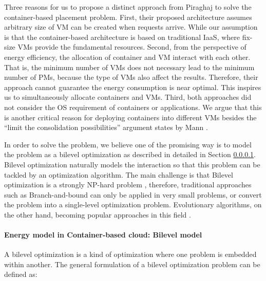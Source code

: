 Three reasons for us to propose a distinct approach from Piraghaj \cite{Piraghaj:2016bw} to solve the container-based placement problem. First, their proposed architecture assumes arbitrary size of VM can be created when requests arrive. While our assumption is that the container-based architecture is based on traditional IaaS, where fix-size VMs provide the fundamental resources. Second, from the perspective of energy efficiency, the allocation of container and VM interact with each other. That is, the minimum number of VMs does not necessary lead to the minimum number of PMs, because the type of VMs also affect the results. Therefore, their approach cannot guarantee the energy consumption is near optimal. This inspires us to simultaneously allocate containers and VMs. Third, both approaches did not consider the OS requirement of containers or applications. We argue that this is another critical reason for deploying containers into different VMs besides the ``limit the consolidation possibilities'' argument states by Mann \cite{Mann:2016hx}.

In order to solve the problem, we believe one of the promising way is to model the problem as a bilevel optimization \cite{Colson:2007bu} as described in detailed in Section \ref{bilevel}. Bilevel optimization naturally models the interaction so that this problem can be tackled by an optimization algorithm. The main challenge is that Bilevel optimization is a strongly NP-hard problem \cite{Sinha:2013tn}, therefore, traditional approaches such as Branch-and-bound \cite{Bard:1982gsa} can only be applied in very small problems, or convert the problem into a single-level optimization problem. Evolutionary algorithms, on the other hand, becoming popular approaches in this field \cite{Wang:2005fa, Sinha:2013tn}. 



\paragraph{Energy model in Container-based cloud: Bilevel model}
\label{bilevel}

A bilevel optimization \cite{Colson:2007bu} is a kind of optimization where one problem is embedded within another.
The general formulation of a bilevel optimization problem can be defined as: 

